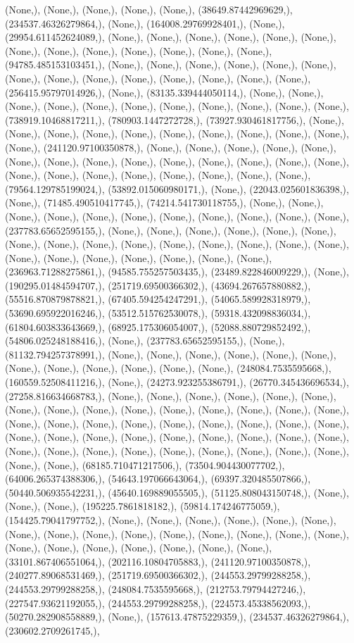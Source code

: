 \documentclass{article}
\begin{document}
(None,), (None,), (None,), (None,), (None,), (38649.87442969629,), (234537.46326279864,), (None,), (164008.29769928401,), (None,), (29954.611452624089,), (None,), (None,), (None,), (None,), (None,), (None,), (None,), (None,), (None,), (None,), (None,), (None,), (None,), (94785.485153103451,), (None,), (None,), (None,), (None,), (None,), (None,), (None,), (None,), (None,), (None,), (None,), (None,), (None,), (None,), (256415.95797014926,), (None,), (83135.339444050114,), (None,), (None,), (None,), (None,), (None,), (None,), (None,), (None,), (None,), (None,), (None,), (738919.10468817211,), (780903.1447272728,), (73927.930461817756,), (None,), (None,), (None,), (None,), (None,), (None,), (None,), (None,), (None,), (None,), (None,), (241120.97100350878,), (None,), (None,), (None,), (None,), (None,), (None,), (None,), (None,), (None,), (None,), (None,), (None,), (None,), (None,), (None,), (None,), (None,), (None,), (None,), (None,), (None,), (None,), (79564.129785199024,), (53892.015060980171,), (None,), (22043.025601836398,), (None,), (71485.490510417745,), (74214.541730118755,), (None,), (None,), (None,), (None,), (None,), (None,), (None,), (None,), (None,), (None,), (None,), (237783.65652595155,), (None,), (None,), (None,), (None,), (None,), (None,), (None,), (None,), (None,), (None,), (None,), (None,), (None,), (None,), (None,), (None,), (None,), (None,), (None,), (None,), (None,), (None,), (236963.71288275861,), (94585.755257503435,), (23489.822846009229,), (None,), (190295.01484594707,), (251719.69500366302,), (43694.267657880882,), (55516.870879878821,), (67405.594254247291,), (54065.589928318979,), (53690.695922016246,), (53512.515762530078,), (59318.432098836034,), (61804.603833643669,), (68925.175306054007,), (52088.880729852492,), (54806.025248188416,), (None,), (237783.65652595155,), (None,), (81132.794257378991,), (None,), (None,), (None,), (None,), (None,), (None,), (None,), (None,), (None,), (None,), (None,), (None,), (248084.7535595668,), (160559.52508411216,), (None,), (24273.923255386791,), (26770.345436696534,), (27258.816634668783,), (None,), (None,), (None,), (None,), (None,), (None,), (None,), (None,), (None,), (None,), (None,), (None,), (None,), (None,), (None,), (None,), (None,), (None,), (None,), (None,), (None,), (None,), (None,), (None,), (None,), (None,), (None,), (None,), (None,), (None,), (None,), (None,), (None,), (None,), (None,), (None,), (None,), (None,), (None,), (None,), (None,), (None,), (None,), (None,), (68185.710471217506,), (73504.904430077702,), (64006.265374388306,), (54643.197066643064,), (69397.320485507866,), (50440.506935542231,), (45640.169889055505,), (51125.808043150748,), (None,), (None,), (None,), (195225.7861818182,), (59814.174246775059,), (154425.79041797752,), (None,), (None,), (None,), (None,), (None,), (None,), (None,), (None,), (None,), (None,), (None,), (None,), (None,), (None,), (None,), (None,), (None,), (None,), (None,), (None,), (None,), (None,), (33101.867406551064,), (202116.10804705883,), (241120.97100350878,), (240277.89068531469,), (251719.69500366302,), (244553.29799288258,), (244553.29799288258,), (248084.7535595668,), (212753.79794427246,), (227547.93621192055,), (244553.29799288258,), (224573.45338562093,), (50270.282908558889,), (None,), (157613.47875229359,), (234537.46326279864,), (230602.2709261745,), 
\end{document}
